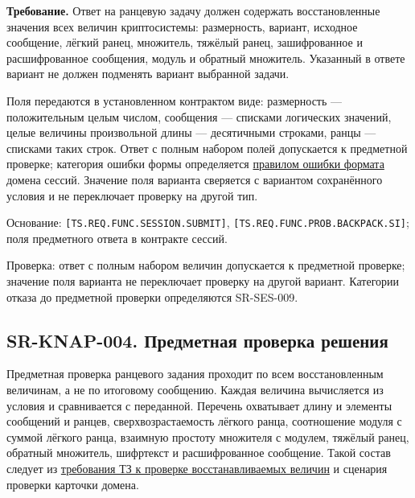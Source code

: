 \documentclass[12pt,a4paper]{article}
\begin{document}
\textbf{Требование.} Ответ на ранцевую задачу должен содержать восстановленные значения всех величин криптосистемы: размерность, вариант, исходное сообщение, лёгкий ранец, множитель, тяжёлый ранец, зашифрованное и расшифрованное сообщения, модуль и обратный множитель. Указанный в ответе вариант не должен подменять вариант выбранной задачи.

Поля передаются в установленном контрактом виде: размерность --- положительным целым числом, сообщения --- списками логических значений, целые величины произвольной длины --- десятичными строками, ранцы --- списками таких строк. Ответ с полным набором полей допускается к предметной проверке; категория ошибки формы определяется \hyperref[sr-ses-009-ux43eux448ux438ux431ux43aux430-ux444ux43eux440ux43cux430ux442ux430]{правилом ошибки формата} домена сессий. Значение поля варианта сверяется с вариантом сохранённого условия и не переключает проверку на другой тип.

Основание: \texttt{[TS.\allowbreak{}REQ.\allowbreak{}FUNC.\allowbreak{}SESSION.\allowbreak{}SUBMIT]}, \texttt{[TS.\allowbreak{}REQ.\allowbreak{}FUNC.\allowbreak{}PROB.\allowbreak{}BACKPACK.\allowbreak{}SI]}; поля предметного ответа в контракте сессий.

Проверка: ответ с полным набором величин допускается к предметной проверке; значение поля варианта не переключает проверку на другой вариант. Категории отказа до предметной проверки определяются SR-SES-009.

\subsection{SR-KNAP-004. Предметная проверка решения}\label{sr-knap-004-ux43fux440ux435ux434ux43cux435ux442ux43dux430ux44f-ux43fux440ux43eux432ux435ux440ux43aux430-ux440ux435ux448ux435ux43dux438ux44f}

\hypertarget{sr-knap-004-предметная-проверка-решения}{}

Предметная проверка ранцевого задания проходит по всем восстановленным величинам, а не по итоговому сообщению. Каждая величина вычисляется из условия и сравнивается с переданной. Перечень охватывает длину и элементы сообщений и ранцев, сверхвозрастаемость лёгкого ранца, соотношение модуля с суммой лёгкого ранца, взаимную простоту множителя с модулем, тяжёлый ранец, обратный множитель, шифртекст и расшифрованное сообщение. Такой состав следует из \href{../02_\%D0\%A2\%D0\%B5\%D1\%85\%D0\%BD\%D0\%B8\%D1\%87\%D0\%B5\%D1\%81\%D0\%BA\%D0\%BE\%D0\%B5_\%D0\%B7\%D0\%B0\%D0\%B4\%D0\%B0\%D0\%BD\%D0\%B8\%D0\%B5/\%D0\%A2\%D0\%B5\%D1\%85\%D0\%BD\%D0\%B8\%D1\%87\%D0\%B5\%D1\%81\%D0\%BA\%D0\%BE\%D0\%B5_\%D0\%B7\%D0\%B0\%D0\%B4\%D0\%B0\%D0\%BD\%D0\%B8\%D0\%B5.pdf}{требования ТЗ к проверке восстанавливаемых величин} и сценария проверки карточки домена.
\end{document}
